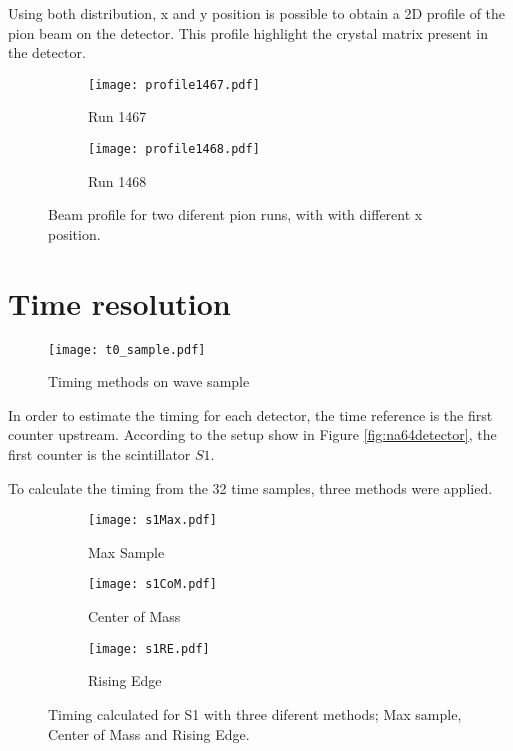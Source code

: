 Using both distribution, x and y position is possible to obtain a 2D profile of the pion beam on the detector. This
profile highlight the crystal matrix present in the detector. 

\begin{figure}[ht]
	\hspace*{\fill}
	\centering
		\begin{subfigure}[b]{0.45\textwidth}
			\texttt{[image: profile1467.pdf]}
			\caption{Run 1467}\label{}
		\end{subfigure}
		\hfill
		\begin{subfigure}[b]{0.45\textwidth}
			\texttt{[image: profile1468.pdf]}
			\caption{Run 1468}\label{}
		\end{subfigure}
\hspace*{\fill}
	\caption{Beam profile for two diferent pion runs, with with different x position.}\label{profile}
\end{figure}






\section{Time resolution}
\begin{figure}[ht]
	\hspace*{\fill}
	\centering
	\texttt{[image: t0\_sample.pdf]}
	\hspace*{\fill}
	\caption{Timing methods on wave sample}\label{}
\end{figure}

In order to estimate the timing for each detector, the time reference is the first counter upstream. According to the
setup show in Figure \ref{fig:na64detector}, the first counter is the scintillator $S1$. \par
To calculate the timing from the 32 time samples, three methods were applied.\par


\begin{figure}[hb]
	\hspace*{\fill}
	\begin{subfigure}[b]{0.3\textwidth}
	\centering
	\texttt{[image: s1Max.pdf]}
	\caption{Max Sample}\label{}
	\end{subfigure}
	\begin{subfigure}[b]{0.3\textwidth}
	\centering
	\texttt{[image: s1CoM.pdf]}
	\caption{Center of Mass}\label{}
	\end{subfigure}
	\begin{subfigure}[b]{0.3\textwidth}
	\centering
	\texttt{[image: s1RE.pdf]}
	\caption{Rising Edge}\label{}
	\end{subfigure}\hspace*{\fill}
	\caption{Timing calculated for S1 with three diferent methods; Max sample, Center of Mass and Rising Edge. }\label{}
\end{figure}



